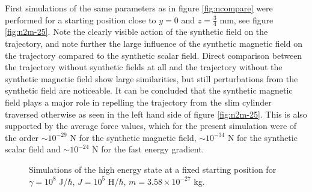 \documentclass[main.tex]{subfiles}
\begin{document}
First simulations of the same parameters as in figure \ref{fig:ncompare} were performed for
a starting position close to \(y=0\) and \(z = \frac{3}{4}\) mm, see figure
\ref{fig:n2m-25}. Note the clearly visible action of the synthetic field on the trajectory,
and note further the large influence of the synthetic magnetic field on the trajectory
compared to the synthetic scalar field. Direct comparison between the trajectory without
synthetic fields at all and the trajectory without the synthetic magnetic field show large
similarities, but still perturbations from the synthetic field are noticeable. It can be
concluded that the synthetic magnetic field plays a major role in repelling the trajectory
from the slim cylinder traversed otherwise as seen in the left hand side of figure \ref{fig:n2m-25}. This is also
supported by the average force values, which for the present simulation were of the order
\(\sim 10^{-29}\) N for the synthetic magnetic field, \(\sim 10^{-34}\) N for the synthetic
scalar field and \(\sim 10^{-24}\) N for the fast energy gradient.

\begin{figure}[h]
    \centering
    \qquad
    \caption{\centering Simulations of the high energy state at a fixed starting position for \(\gamma
    = 10^{8}\) J/\(\hbar{}\), \(J= 10^{5}\) H/\(\hbar{}\), \(m = 3.58\times 10^{-27}\) kg.}%
    \label{fig:n2m-27A}
\end{figure}
\end{document}
